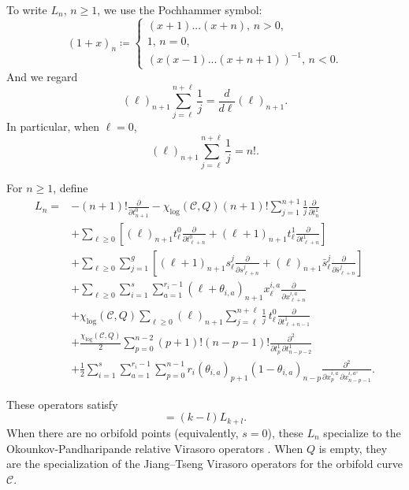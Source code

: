 \documentclass[letterpaper,12pt]{amsart}
\theoremstyle{definition}
\newcommand{\cC}{\mathcal C}
\numberwithin{equation}{section}
\begin{document}
To write $L_n$, $n\geq 1$, we use the Pochhammer symbol:
\begin{equation*}
    (1+x)_n\coloneqq
    \begin{cases}
    (x+1) ... (x+n),\, n>0, \\
    1,\, n=0,\\
    (x(x-1) ... (x+n+1))^{-1},\, n<0.
    \end{cases}
\end{equation*}
And we regard 
\[(\ell)_{n+1}\sum_{j=\ell}^{n+\ell}\frac{1}{j}=\frac{d}{d\ell}(\ell)_{n+1}.\]
In particular, when $\ell=0$, 
\[(\ell)_{n+1}\sum_{j=\ell}^{n+\ell}\frac{1}{j}=n!.\]

For $n\ge1$, define
\begin{align*}
L_n={}&
-(n+1)!\frac{\partial}{\partial t^0_{n+1}}
-\chi_{\log}(\cC, Q)(n+1)!\sum_{j=1}^{n+1}\frac{1}{j}
\frac{\partial}{\partial t^1_n}\nonumber\\
&+\sum_{\ell\ge0}\left[
(\ell)_{n+1}t^0_\ell\frac{\partial}{\partial t^0_{\ell+n}}
+(\ell+1)_{n+1}t^1_\ell\frac{\partial}{\partial t^1_{\ell+n}}
\right]\nonumber\\
&+\sum_{\ell\ge0}\sum_{j=1}^g\left[
(\ell+1)_{n+1}s^j_\ell\frac{\partial}{\partial s^j_{\ell+n}}
+(\ell)_{n+1}\bar s^j_\ell\frac{\partial}{\partial \bar s^j_{\ell+n}}
\right]\nonumber\\
&+\sum_{\ell\ge0}\sum_{i=1}^s\sum_{a=1}^{r_i-1}
(\ell+\theta_{i,a})_{n+1}
 x^{i,a}_\ell\frac{\partial}{\partial x^{i,a}_{\ell+n}}\nonumber\\
&+\chi_{\log}(\cC, Q)\sum_{\ell\ge0}
(\ell)_{n+1}\sum_{j=\ell}^{n+\ell}\frac{1}{j}\,t^0_\ell
\frac{\partial}{\partial t^1_{\ell+n-1}}\nonumber\\
&+\frac{\chi_{\log}(\cC, Q)}2
\sum_{p=0}^{n-2}(p+1)!(n-p-1)!
\frac{\partial^2}{\partial t^1_p\,\partial t^1_{n-p-2}}\nonumber\\
&+\frac{1}{2}\sum_{i=1}^s\sum_{a=1}^{r_i-1}
\sum_{p=0}^{n-1}
r_i(\theta_{i,a})_{p+1}(1-\theta_{i,a})_{n-p}
\frac{\partial^2}{\partial x^{i,a}_p\,\partial x^{i,a^\vee}_{n-p-1}}.
\end{align*}

These operators satisfy
\begin{equation*}
[L_k,L_l]=(k-l)L_{k+l}.
\end{equation*}
When there are no orbifold points (equivalently, $s=0$), these $L_n$ 
specialize to the Okounkov-Pandharipande relative Virasoro operators \cite{OP3}. When $Q$ is empty, they are the specialization of the Jiang–Tseng Virasoro operators for the orbifold curve $\cC$.
\end{document}
